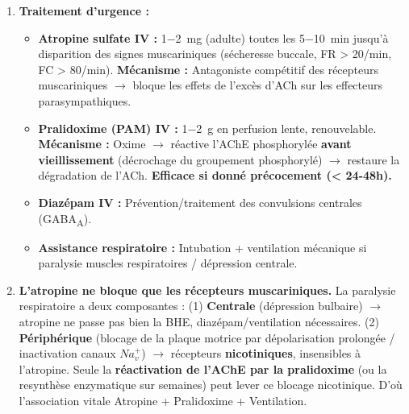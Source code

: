 \documentclass[11pt]{article}
\begin{document}
\begin{exoresolu}
\begin{enumerate}
\begin{itemize}
        \item \textbf{Effets centraux :} Confusion, agitation, convulsions, dépression respiratoire centrale (accumulation ACh dans SNC).
    \end{itemize}
    \item \textbf{Traitement d'urgence :}
    \begin{itemize}
        \item \textbf{Atropine sulfate IV :} \SI{1-2}{\milli\gram} (adulte) toutes les \SI{5-10}{\minute} jusqu'à disparition des signes muscariniques (sécheresse buccale, FR > 20/min, FC > 80/min). \textbf{Mécanisme :} Antagoniste compétitif des récepteurs muscariniques $\rightarrow$ bloque les effets de l'excès d'ACh sur les effecteurs parasympathiques.
        \item \textbf{Pralidoxime (PAM) IV :} \SI{1-2}{\gram} en perfusion lente, renouvelable. \textbf{Mécanisme :} Oxime $\rightarrow$ réactive l'AChE phosphorylée \textbf{avant vieillissement} (décrochage du groupement phosphorylé) $\rightarrow$ restaure la dégradation de l'ACh. \textbf{Efficace si donné précocement (< 24-48h).}
        \item \textbf{Diazépam IV :} Prévention/traitement des convulsions centrales (GABA\textsubscript{A}).
        \item \textbf{Assistance respiratoire :} Intubation + ventilation mécanique si paralysie muscles respiratoires / dépression centrale.
    \end{itemize}
    \item \textbf{L'atropine ne bloque que les récepteurs muscariniques.} La paralysie respiratoire a deux composantes : (1) \textbf{Centrale} (dépression bulbaire) $\rightarrow$ atropine ne passe pas bien la BHE, diazépam/ventilation nécessaires. (2) \textbf{Périphérique} (blocage de la plaque motrice par dépolarisation prolongée / inactivation canaux $Na_v^+$) $\rightarrow$ récepteurs \textbf{nicotiniques}, insensibles à l'atropine. Seule la \textbf{réactivation de l'AChE par la pralidoxime} (ou la resynthèse enzymatique sur semaines) peut lever ce blocage nicotinique. D'où l'association vitale Atropine + Pralidoxime + Ventilation.
\end{enumerate}
\end{exoresolu}
\end{document}
